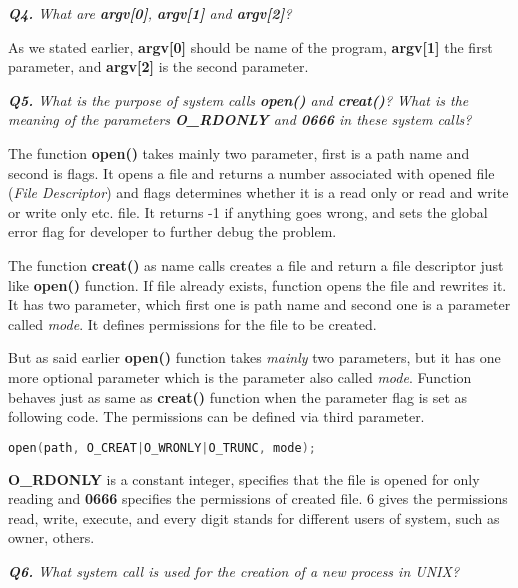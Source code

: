 \documentclass[11pt]{article}
\begin{document}
\vspace{5mm}
\textit{\textbf{Q4.} What are \textbf{argv[0]}, \textbf{argv[1]} and \textbf{argv[2]}?}
\vspace{5mm}

As we stated earlier, \textbf{argv[0]} should be name of the program, \textbf{argv[1]} the first parameter, and \textbf{argv[2]} is the second parameter. 

\vspace{5mm}
\textit{\textbf{Q5.} What is the purpose of system calls \textbf{open()} and \textbf{creat()}? What is the meaning of the parameters \textbf{O\_RDONLY} and \textbf{0666} in these system calls?}
\vspace{5mm}

The function \textbf{open()} takes mainly two parameter, first is a path name and second is flags. It opens a file and returns a number associated with opened file (\textit{File Descriptor}) and flags determines whether it is a read only or read and write or write only etc. file. It returns -1 if anything goes wrong, and sets the global error flag for developer to further debug the problem. 

The function \textbf{creat()} as name calls creates a file and return a file descriptor just like \textbf{open()} function. If file already exists, function opens the file and rewrites it.  It has two parameter, which first one is path name and second one is a parameter called \textit{mode}. It defines permissions for the file to be created.

But as said earlier \textbf{open()}  function takes \textit{mainly} two parameters, but it has one more optional parameter which is the parameter also called \textit{mode}. Function behaves just as same as \textbf{creat()} function when the parameter flag is set as following code. The permissions can be defined via third parameter.

\begin{lstlisting}[language=C]
open(path, O_CREAT|O_WRONLY|O_TRUNC, mode);
\end{lstlisting}

\textbf{O\_RDONLY} is a constant integer, specifies that the file is opened for only reading and \textbf{0666} specifies the permissions of created file. 6 gives the permissions read, write, execute, and every digit stands for different users of system, such as owner, others.

\vspace{5mm}
\textit{\textbf{Q6.} What system call is used for the creation of a new process in UNIX?}
\vspace{5mm}
\end{document}
